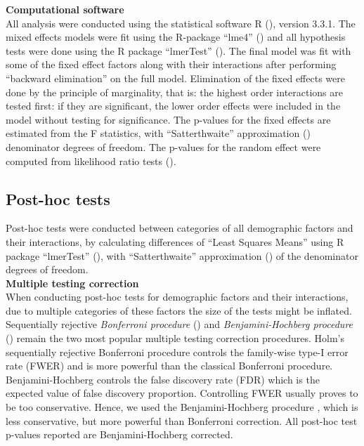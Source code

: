 \documentclass[11pt]{extarticle} %
\begin{document}
\noindent
{\bf{Computational software}}\\
All analysis were conducted using the statistical software R (\cite{R}), version 3.3.1. The mixed effects models were fit using the R-package ``lme4'' (\cite{R-lme4}) and all hypothesis tests were done using the R package ``lmerTest'' (\cite{Kuznetsova_etal_2015_R-lmerTest}). The final model was fit with some of the fixed effect factors along with their interactions after performing ``backward elimination'' on the full model. Elimination of the fixed effects were done by the principle of marginality, that is: the highest order interactions are tested first: if they are significant, the lower order effects were included in the model without testing for significance. The p-values for the fixed effects are estimated from the F statistics, with ``Satterthwaite'' approximation (\cite{Satterthwaite_1946_Biometrics}) denominator degrees of freedom. The p-values for the random effect were computed from likelihood ratio tests (\cite{Morrell_1998_Biometrics}). 

\subsection{Post-hoc tests}
Post-hoc tests were conducted between categories of all demographic factors and their interactions, by calculating differences of ``Least Squares Means'' using R package ``lmerTest'' (\cite{Kuznetsova_etal_2015_R-lmerTest}), with ``Satterthwaite'' approximation (\cite{Satterthwaite_1946_Biometrics}) of the denominator degrees of freedom. \\
\noindent
{\bf{Multiple testing correction}}\\
When conducting post-hoc tests for demographic factors and their interactions, due to multiple categories of these factors the size of the tests might be inflated. Sequentially rejective {\emph{Bonferroni procedure}} (\cite{Holm_1979_SJS}) and {\emph{Benjamini-Hochberg procedure}} (\cite{Benjamini_Hochberg_1995_JRSSB}) remain the two most popular multiple testing correction procedures. Holm's sequentially rejective Bonferroni procedure controls the family-wise type-I error rate (FWER) and is more powerful than the classical Bonferroni procedure. Benjamini-Hochberg controls the false discovery rate (FDR) which is the expected value of false discovery proportion. Controlling FWER usually proves to be too conservative. Hence, we used the Benjamini-Hochberg procedure , which is less conservative, but more powerful than Bonferroni correction. All post-hoc test p-values reported are Benjamini-Hochberg corrected.
\end{document}
